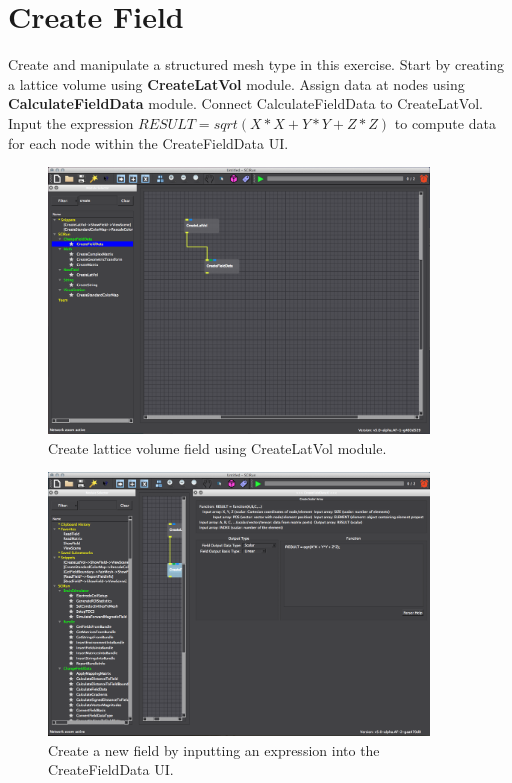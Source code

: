 \documentclass[fleqn,11pt,openany]{book}
\begin{document}
\section{Create Field}\label{createfield}

Create and manipulate a structured mesh type in this exercise.
Start by creating a lattice volume using \textbf{CreateLatVol} module.
Assign data at nodes using \textbf{CalculateFieldData} module.
Connect CalculateFieldData to CreateLatVol. Input the expression $RESULT = sqrt(X*X + Y*Y + Z*Z)$ to compute data for each node within the CreateFieldData UI.

\begin{figure}[H]
\center
\includegraphics[width=0.9\textwidth]{BasicTutorial_figures/create.png}
\caption{Create lattice volume field using CreateLatVol module.}
\label{fig:createnewfield}
\end{figure}

\begin{figure}[H]
\center
\includegraphics[width=0.9\textwidth]{BasicTutorial_figures/fielddata.png}
\caption{Create a new field by inputting an expression into the CreateFieldData UI. }
\label{fig:calcfielddata}
\end{figure}
\end{document}
